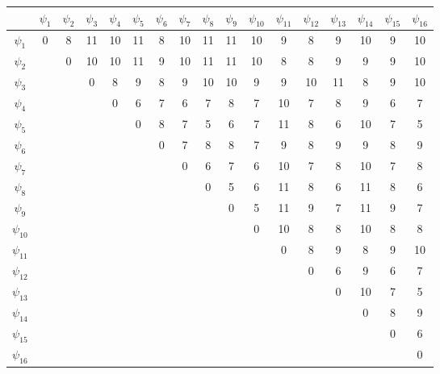 \documentclass[12pt,a4paper]{report}
\begin{document}
\hfill\break
\begin{tabular}{|c|c|c|c|c|c|c|c|c|c|c|c|c|c|c|c|c|}
    \hline
    & $\psi_{1}$ & $\psi_{2}$ & $\psi_{3}$ & $\psi_{4}$ & $\psi_{5}$ & $\psi_{6}$ & $\psi_{7}$ & $\psi_{8}$ & $\psi_{9}$ & $\psi_{10}$ & $\psi_{11}$ & $\psi_{12}$ & $\psi_{13}$ & $\psi_{14}$ & $\psi_{15}$ & $\psi_{16}$\\
    \hline
    $\psi_{1}$ & 0 & 8 & 11 & 10 & 11 & 8 & 10 & 11 & 11 & 10 & 9  & 8	 & 9  & 10 & 9 & 10 \\
    \hline
    $\psi_{2}$ &   & 0 & 10 & 10 & 11 & 9 & 10 & 11 & 11 & 10 & 8  & 8	 & 9  & 9  & 9 & 10 \\
    \hline
    $\psi_{3}$ &   &   & 0  & 8  & 9  & 8 & 9  & 10 & 10 & 9  & 9  & 10 & 11 & 8  & 9 & 10 \\
    \hline
    $\psi_{4}$ &   &   &    & 0  & 6  & 7 & 6  & 7  & 8  & 7  & 10 & 7  & 8  & 9  & 6 & 7  \\
    \hline
    $\psi_{5}$ &   &   &    &    & 0  & 8 & 7  & 5  & 6  & 7  & 11 & 8  & 6  & 10 & 7 & 5  \\
    \hline
    $\psi_{6}$ &   &   &    &    &    & 0 & 7  & 8  & 8  & 7  & 9  & 8  & 9  & 9  & 8 & 9  \\
    \hline
    $\psi_{7}$ &   &   &    &    &    &   & 0  & 6  & 7  & 6  & 10 & 7  & 8  & 10 & 7 & 8  \\
    \hline
    $\psi_{8}$ &   &   &    &    &    &   &    & 0  & 5  & 6  & 11 & 8  & 6  & 11 & 8 & 6  \\
    \hline
    $\psi_{9}$ &   &   &    &    &    &   &    &    & 0  & 5  & 11 & 9  & 7  & 11 & 9 & 7  \\
    \hline
    $\psi_{10}$ &   &   &    &    &    &   &    &    &    & 0  & 10 & 8  & 8  & 10 & 8 & 8  \\
    \hline
    $\psi_{11}$ &   &   &    &    &    &   &    &    &    &    & 0  & 8  & 9  & 8  & 9 & 10 \\
    \hline
    $\psi_{12}$ &   &   &    &    &    &   &    &    &    &    &    & 0  & 6  & 9  & 6 & 7  \\
    \hline
    $\psi_{13}$ &   &   &    &    &    &   &    &    &    &    &    &    & 0  & 10 & 7 & 5  \\
    \hline
    $\psi_{14}$ &   &   &    &    &    &   &    &    &    &    &    &    &    & 0  & 8 & 9  \\
    \hline
    $\psi_{15}$ &   &   &    &    &    &   &    &    &    &    &    &    &    &    & 0 & 6  \\
    \hline
    $\psi_{16}$ &   &   &    &    &    &   &    &    &    &    &    &    &    &    &   & 0  \\
    \hline
\end{tabular}\\
\end{document}
